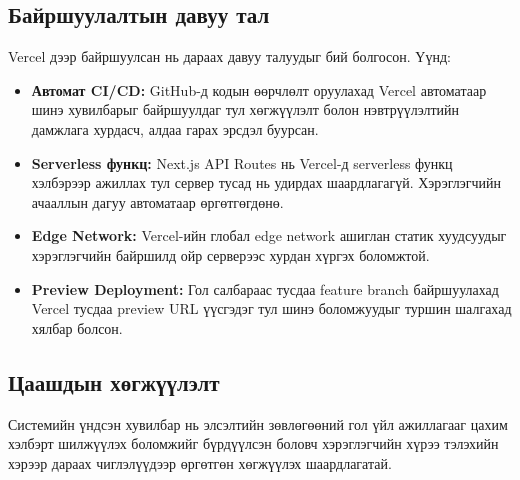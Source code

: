 \subsection*{Байршуулалтын давуу тал}

Vercel дээр байршуулсан нь дараах давуу талуудыг бий болгосон. Үүнд:

\begin{itemize}
    \item \textbf{Автомат CI/CD:} GitHub-д кодын өөрчлөлт оруулахад
    Vercel автоматаар шинэ хувилбарыг байршуулдаг тул хөгжүүлэлт
    болон нэвтрүүлэлтийн дамжлага хурдасч, алдаа гарах эрсдэл
    буурсан.

    \item \textbf{Serverless функц:} Next.js API Routes нь Vercel-д
    serverless функц хэлбэрээр ажиллах тул сервер тусад нь
    удирдах шаардлагагүй. Хэрэглэгчийн ачааллын дагуу автоматаар
    өргөтгөгдөнө.

    \item \textbf{Edge Network:} Vercel-ийн глобал edge network ашиглан
    статик хуудсуудыг хэрэглэгчийн байршилд ойр серверээс хурдан
    хүргэх боломжтой.

    \item \textbf{Preview Deployment:} Гол салбараас тусдаа
    feature branch байршуулахад Vercel тусдаа preview URL үүсгэдэг
    тул шинэ боломжуудыг туршин шалгахад хялбар болсон.
\end{itemize}

\subsection*{Цаашдын хөгжүүлэлт}

\par Системийн үндсэн хувилбар нь элсэлтийн зөвлөгөөний гол үйл ажиллагааг
цахим хэлбэрт шилжүүлэх боломжийг бүрдүүлсэн боловч хэрэглэгчийн хүрээ
тэлэхийн хэрээр дараах чиглэлүүдээр өргөтгөн хөгжүүлэх шаардлагатай.

